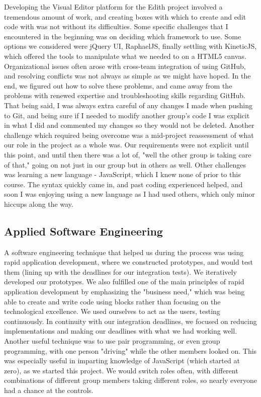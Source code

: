\documentclass[a4paper]{article}
\begin{document}
	Developing the Visual Editor platform for the Edith project involved a tremendous amount of work, and creating boxes with which to create and edit code with was not without its difficulties. Some specific challenges that I encountered in the beginning was on deciding which framework to use. Some options we considered were jQuery UI, RaphaelJS, finally settling with KineticJS, which offered the tools to manipulate what we needed to on a HTML5 canvas. Organizational issues often arose with cross-team integration of using GitHub, and resolving conflicts was not always as simple as we might have hoped. In the end, we figured out how to solve these problems, and came away from the problems with renewed expertise and troubleshooting skills regarding GitHub. That being said, I was always extra careful of any changes I made when pushing to Git, and being sure if I needed to modify another group's code I was explicit in what I did and commented my changes so they would not be deleted. Another challenge which required being overcome was a mid-project reassessment of what our role in the project as a whole was. Our requirements were not explicit until this point, and until then there was a lot of, "well the other group is taking care of that," going on not just in our group but in others as well. Other challenges was learning a new language - JavaScript, which I knew none of prior to this course. The syntax quickly came in, and past coding experienced helped, and soon I was enjoying using a new language as I had used others, which only minor hiccups along the way.

\subsection{Applied Software Engineering}
	A software engineering technique that helped us during the process was using rapid application development, where we constructed prototypes, and would test them (lining up with the deadlines for our integration tests). We iteratively developed our prototypes. We also fulfilled one of the main principles of rapid application development by emphasizing the "business need," which was being able to create and write code using blocks rather than focusing on the technological excellence. We used ourselves to act as the users, testing continuously. In continuity with our integration deadlines, we focused on reducing implementations and making our deadlines with what we had working well. Another useful technique was to use pair programming, or even group programming, with one person "driving" while the other members looked on. This was especially useful in imparting knowledge of JavaScript (which started at zero), as we started this project. We would switch roles often, with different combinations of different group members taking different roles, so nearly everyone had a chance at the controls.
\end{document}
